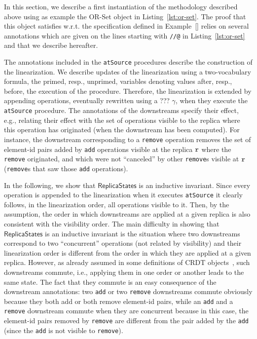 In this section, we describe a first instantiation of the methodology described above using as example the OR-Set object in Listing~\ref{lst:or-set}. The proof that this object satisfies \crdtlin{} w.r.t. the specification defined in Example~\ref{} relies on several annotations which are given on the lines starting with {\tt //@} in Listing~\ref{lst:or-set} and that we describe hereafter.

The annotations included in the {\tt atSource} procedures describe the construction of the linearization. We describe updates of the linearization using a two-vocabulary formula, the primed, resp., unprimed, variables denoting values after, resp., before, the execution of the procedure. Therefore, the linearization is extended by appending operations, eventually rewritten using a ??? $\gamma$, when they execute the {\tt atSource} procedure.
The annotations of the downstreams specify their effect, e.g., relating their effect with the set of operations visible to the replica where this operation has originated (when the downstream has been computed). For instance, the downstream corresponding to a {\tt remove} operation removes the set of element-id pairs added by {\tt add} operations visible at the replica $\mathtt{r}$ where the {\tt remove} originated, and which were not ``canceled'' by other {\tt remove}s visible at $\mathtt{r}$ ({\tt remove}s that saw those {\tt add} operations).

In the following, we show that $\mathsf{ReplicaStates}$ is an inductive invariant. Since every operation is appended to the linearization when it executes {\tt atSource} it clearly follows, in the linearization order, all operations visible to it. Then, by the {} assumption, the order in which downstreams are applied at a given replica is also consistent with the visibility order. The main difficulty in showing that $\mathsf{ReplicaStates}$ is an inductive invariant is the situation where two downstreams correspond to two ``concurrent'' operations (not related by visibility) and their linearization order is different from the order in which they are applied at a given replica. However, as already assumed in some definitions of CRDT objects~\cite{}, such downstreams commute, i.e., applying them in one order or another leads to the same state. The fact that they commute is an easy consequence of the downstream annotations: two {\tt add} or two {\tt remove} downstreams commute obviously because they both add or both remove element-id pairs, while an {\tt add} and a {\tt remove} downstream commute when they are concurrent because in this case, the element-id pairs removed by {\tt remove} are different from the pair added by the {\tt add} (since the {\tt add} is not visible to {\tt remove}).

